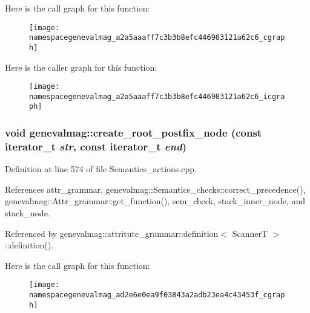 Here is the call graph for this function:\nopagebreak
\begin{figure}[H]
\begin{center}
\leavevmode
\texttt{[image: namespacegenevalmag\_a2a5aaaff7c3b3b8efc446903121a62c6\_cgraph]}
\end{center}
\end{figure}




Here is the caller graph for this function:\nopagebreak
\begin{figure}[H]
\begin{center}
\leavevmode
\texttt{[image: namespacegenevalmag\_a2a5aaaff7c3b3b8efc446903121a62c6\_icgraph]}
\end{center}
\end{figure}


\hypertarget{namespacegenevalmag_ad2e6e0ea9f03843a2adb23ea4c43453f}{
\subsubsection[{create\_\-root\_\-postfix\_\-node}]{\setlength{\rightskip}{0pt plus 5cm}void genevalmag::create\_\-root\_\-postfix\_\-node (const iterator\_\-t {\em str}, \/  const iterator\_\-t {\em end})}}
\label{namespacegenevalmag_ad2e6e0ea9f03843a2adb23ea4c43453f}


Definition at line 574 of file Semantics\_\-actions.cpp.



References attr\_\-grammar, genevalmag::Semantics\_\-checks::correct\_\-precedence(), genevalmag::Attr\_\-grammar::get\_\-function(), sem\_\-check, stack\_\-inner\_\-node, and stack\_\-node.



Referenced by genevalmag::attritute\_\-grammar::definition$<$ ScannerT $>$::definition().



Here is the call graph for this function:\nopagebreak
\begin{figure}[H]
\begin{center}
\leavevmode
\texttt{[image: namespacegenevalmag\_ad2e6e0ea9f03843a2adb23ea4c43453f\_cgraph]}
\end{center}
\end{figure}




